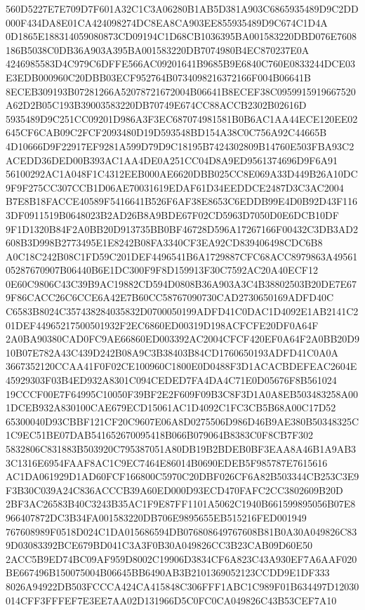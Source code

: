 \documentclass[UTF8,fontset=fandol,zihao=-4,a4paper]{ctexart}
\begin{document}
{{560D5227E7E709D7F601A32C1C3A06280B1AB5D381A903C6865935489D9C2DD000F434DA8E01CA424098274DC8EA8CA903EE855935489D9C674C1D4A
0D1865E188314059080873CD09194C1D68CB1036395BA001583220DBD076E7608186B5038C0DB36A903A395BA001583220DB7074980B4EC870237E0A
4246985583D4C979C6DFFE566AC09201641B9685B9E6840C760E0833244DCE03E3EDB000960C20DBB03ECF952764B0734098216372166F004B06641B
8ECEB309193B07281266A52078721672004B06641B8ECEF38C0959915919667520A62D2B05C193B39003583220DB70749E674CC88ACCB2302B02616D
5935489D9C251CC09201D986A3F3EC687074981581B0B6AC1AA44ECE120EE02645CF6CAB09C2FCF2093480D19D593548BD154A38C0C756A92C44665B
4D10666D9F22917EF9281A599D79D9C18195B7424302809B14760E503FBA93C2ACEDD36DED00B393AC1AA4DE0A251CC04D8A9ED9561374696D9F6A91
56100292AC1A048F1C4312EEB000AE6620DBB025CC8E069A33D449B26A10DC9F9F275CC307CCB1D06AE70031619EDAF61D34EEDDCE2487D3C3AC2004
B7E8B18FACCE40589F5416641B526F6AF38E8653C6EDDB99E4D0B92D43F1163DF0911519B0648023B2AD26B8A9BDE67F02CD5963D7050D0E6DCB10DF
9F1D1320B84F2A0BB20D913735BB0BF46728D596A17267166F00432C3DB3AD2608B3D998B2773495E1E8242B08FA3340CF3EA92CD839406498CDC6B8
A0C18C242B08C1FD59C201DEF4496541B6A1729887CFC68ACC8979863A4956105287670907B06440B6E1DC300F9F8D159913F30C7592AC20A40ECF12
0E60C9806C43C39B9AC19882CD594D0808B36A903A3C4B38802503B20DE7E679F86CACC26C6CCE6A42E7B60CC58767090730CAD2730650169ADFD40C
C6583B8024C357438284035832D0700050199ADFD41C0DAC1D4092E1AB2141C201DEF44965217500501932F2EC6860ED00319D198ACFCFE20DF0A64F
2A0BA90380CAD0FC9AE66860ED003392AC2004CFCF420EF0A64F2A0BB20D910B07E782A43C439D242B08A9C3B38403B84CD1760650193ADFD41C0A0A
3667352120CCAA41F0F02CE100960C1800E0D0488F3D1ACACBDEFEAC2604E45929303F03B4ED932A8301C094CEDED7FA4DA4C71E0D05676F8B561024
19CCCF00E7F64995C10050F39BF2E2F609F09B3C8F3D1A0A8EB503483258A001DCEB932A830100CAE679ECD15061AC1D4092C1FC3CB5B68A00C17D52
65300040D93CBBF121CF20C9607E06A8D0275506D986D46B9AE380B50348325C1C9EC51BE07DAB541652670095418B066B079064B8383C0F8CB7F302
5832806C831883B503920C795387051A80DB19B2BDEB0BF3EAA8A46B1A9AB33C1316E6954FAAF8AC1C9EC7464E86014B0690EDEB5F985787E7615616
AC1DA061929D1AD60FCF166800C5970C20DBF026CF6A82B503344CB253C3E9F3B30C039A24C836ACCCB39A60ED000D93ECD470FAFC2CC3802609B20D
2BF3AC26583B40C3243B35AC1F9E87FF1101A5062C1940B661599895056B07E8966407872DC3B34FA001583220DB706E9895655EB515216FED001949
767608989F0518D024C1DA015686594DB076808649767608B81B0A30A049826C839D03083392BCE679BD041C3A3F0B30A049826CC3B23CAB09D60E50
2ACC5B9ED74BC09AF959D8002C19906D3834CF6A823C43A930EF7A6AAF020BE667496B150075004B06645BB6490AB3B2101369052123CCDD9E1DF333
8026A94922DB503FCCCA424CA415848C306FFF1ABC1C989F01B634497D12030014CFF3FFFEF7E3EE7AA02D131966D5C0FC0CA049826C43B53CEF7A10
}}
\end{document}
